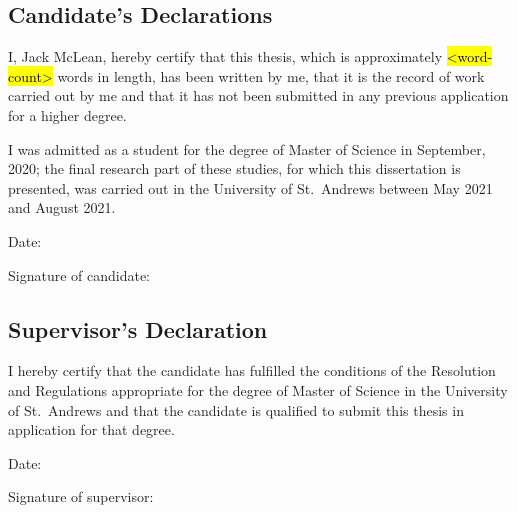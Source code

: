 %
%

\begin{declaration}
\subsection*{Candidate's Declarations}
I, Jack McLean, hereby certify that this thesis, which is approximately \hl{<word-count>} words in length, has been written by me, that it is the record of work carried out by me and that it has not been submitted in any previous application for a higher degree.

I was admitted as a student for the degree of Master of Science in September, 2020; the final research part of these studies, for which this dissertation is presented, was carried out in the University of St.\ Andrews between May 2021 and August 2021.
\vspace{24pt}

Date:
\vspace{16pt}

Signature of candidate:
\vspace{48pt}


\subsection*{Supervisor's Declaration}
I hereby certify that the candidate has fulfilled the conditions of the Resolution and Regulations appropriate for the degree of Master of Science in the University of St.\ Andrews and that the candidate is qualified to submit this thesis in application for that degree.
\vspace{24pt}

Date:
\vspace{16pt}

Signature of supervisor:
\end{declaration}